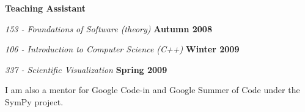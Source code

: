 \documentclass[margin,line]{res}
\newenvironment{list1}{
  \begin{list}{\ding{113}}{%
      \setlength{\itemsep}{0in}
      \setlength{\parsep}{0in} \setlength{\parskip}{0in}
      \setlength{\topsep}{0in} \setlength{\partopsep}{0in} 
      \setlength{\leftmargin}{0.17in}}}{\end{list}}
\begin{document}
\begin{resume}
{\bf Teaching Assistant}
\begin{list1}
\item[] {\em 153 - Foundations of Software (theory)} \hfill {\bf Autumn 2008}
\item[] {\em 106 - Introduction to Computer Science (C++)} \hfill {\bf Winter 2009}
\item[] {\em 337 - Scientific Visualization} \hfill {\bf Spring 2009}
\end{list1}

I am also a mentor for Google Code-in and Google Summer of Code under the SymPy project. 

\end{resume}
\end{document}
